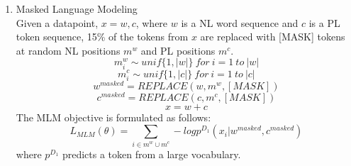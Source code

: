 \begin{enumerate}[topsep = 0pt, label=\roman*.]
\item Masked Language Modeling \\
Given a datapoint, $x = {w, c}$, where $w$ is a NL word sequence and $c$ is a PL token sequence, 15\% of the tokens from $x$ are replaced with [MASK] tokens at random NL positions $m^w$ and PL positions $m^c$.
\begin{equation}
\label{eq:2.9}
m_i^w \sim unif\{1, |w|\}\ for\ i = 1\ to\ |w|
\end{equation}
\begin{equation}
\label{eq:2.10}
m_i^c \sim unif\{1, |c|\}\ for\ i = 1 \ to\ |c|
\end{equation}
\begin{equation}
\label{eq:2.11}
w^{masked} = REPLACE(w, m^w, [MASK])
\end{equation}
\begin{equation}
\label{eq:2.12}
c^{masked} = REPLACE(c, m^c, [MASK])
\end{equation}
\begin{equation}
\label{eq:2.13}
x = w + c
\end{equation}
The MLM objective is formulated as follows:
\begin{equation}
\label{eq:2.14}
L_{MLM}(\theta) = \sum_{i \in m^w \cup m^c} -log p^{D_1}(x_i|w^{masked}, c^{masked})
\end{equation}
where $p^{D_1}$ predicts a token from a large vocabulary.


\end{enumerate}
